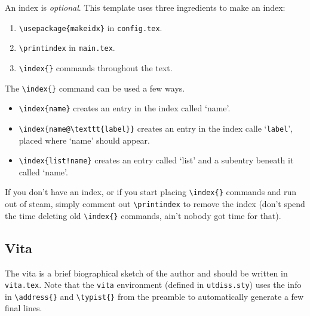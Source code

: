 An index is \emph{optional}.
This template uses three ingredients to make an index:
\begin{enumerate}
    \item \verb+\usepackage{makeidx}+ in \texttt{config.tex}.
    \item \verb+\printindex+ in \texttt{main.tex}.
    \item \verb+\index{}+ commands throughout the text.
\end{enumerate}
The \verb+\index{}+ command can be used a few ways.
\begin{itemize}
    \item \verb+\index{name}+ creates an entry in the index called `name'.
    \item \verb+\index{name@\texttt{label}}+ creates an entry in the index calle `\texttt{label}', placed where `name' should appear.
    \item \verb+\index{list!name}+ creates an entry called `list' and a subentry beneath it called `name'.
\end{itemize}
If you don't have an index, or if you start placing \verb+\index{}+ commands and run out of steam, simply comment out \verb+\printindex+ to remove the index (don't spend the time deleting old \verb+\index{}+ commands, ain't nobody got time for that).

\subsection{Vita} %

The vita is a brief biographical sketch of the author and should be written in \texttt{vita.tex}.
Note that the \verb"vita" environment (defined in \texttt{utdiss.sty}) uses the info in \verb+\address{}+ and \verb+\typist{}+ from the preamble to automatically generate a few final lines.
